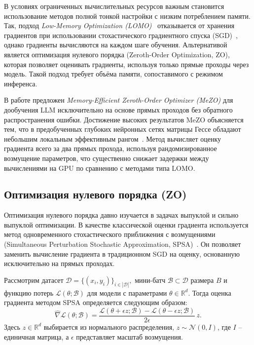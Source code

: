 \documentclass[LI,KR]{HSEUniversity}
\begin{document}
В условиях ограниченных вычислительных ресурсов важным становится использование методов полной тонкой настройки с низким потреблением памяти.
Так, подход \emph{Low-Memory Optimization (LOMO)}~\cite{adalomo} отказывается от хранения градиентов при использовании стохастического градиентного спуска (SGD)~\cite{sgd, sgd-analysis}, однако градиенты вычисляются на каждом шаге обучения.
Альтернативой является оптимизация нулевого порядка (Zeroth-Order Optimization, ZO), которая позволяет оценивать градиенты, используя только прямые проходы через модель.
Такой подход требует объёма памяти, сопоставимого с режимом инференса.

В работе \cite{mezo} предложен \emph{Memory-Efficient Zeroth-Order Optimizer (MeZO)} для дообучения LLM исключительно на основе прямых проходов без обратного распространения ошибки.
Достижение высоких результатов MeZO объясняется тем, что в предобученных глубоких нейронных сетях матрицы Гессе обладают небольшим локальным эффективным рангом~\cite{hessianrank1, hessianrank2, hessianrank3}.
Метод вычисляет оценку градиента всего за два прямых прохода, используя рандомизированное возмущение параметров, что существенно снижает задержки между вычислениями на GPU по сравнению с методами типа LOMO.

\subsection{Оптимизация нулевого порядка (ZO)}\label{subsec:ZO}
Оптимизация нулевого порядка давно изучается в задачах выпуклой и сильно выпуклой оптимизации.
В качестве классической оценки градиента используется метод одновременного стохастического приближения с возмущениями (Simultaneous Perturbation Stochastic Approximation, SPSA)~\cite{spsa}.
Он позволяет заменить вычисление градиента в традиционном SGD на оценку, основанную исключительно на прямых проходах.

Рассмотрим датасет
$
\mathcal{D} = \{(x_i, y_i)\}_{i\in|\mathcal{D}|},
$
мини-батч
$
\mathcal{B} \subset \mathcal{D}
$
размера $B$ и функцию потерь $\mathcal{L}(\theta; \mathcal{B})$ для модели с параметрами $\theta \in \mathbb{R}^d$.
Тогда оценка градиента методом SPSA определяется следующим образом:
$$
\widehat{\nabla} \mathcal{L}(\theta; \mathcal{B}) = \frac{\mathcal{L}(\theta + \epsilon z; \mathcal{B}) - \mathcal{L}(\theta - \epsilon z; \mathcal{B})}{2\epsilon}\, z.
$$
Здесь $z \in \mathbb{R}^d$ выбирается из нормального распределения, $z \sim \mathcal{N}(0, I)$, где $I$ – единичная матрица, а $\epsilon$ представляет масштаб возмущения.
\end{document}
